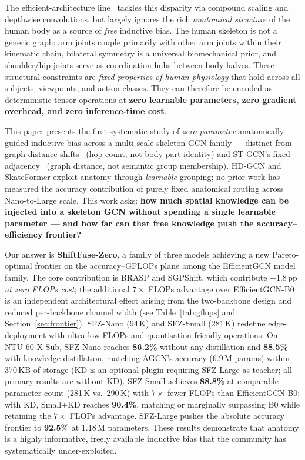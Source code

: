 \documentclass[sigconf,screen,review,anonymous]{acmart}
\begin{document}
The efficient-architecture line~\cite{efficientgcn,sgn} tackles this
disparity via compound scaling and depthwise convolutions, but largely
ignores the rich \emph{anatomical structure} of the human body as a
source of \emph{free} inductive bias.
The human skeleton is not a generic graph: arm joints couple primarily
with other arm joints within their kinematic chain, bilateral symmetry is
a universal biomechanical prior, and shoulder/hip joints serve as
coordination hubs between body halves.
These structural constraints are \emph{fixed properties of human physiology}
that hold across all subjects, viewpoints, and action classes.
They can therefore be encoded as deterministic tensor operations at
\textbf{zero learnable parameters, zero gradient overhead, and zero
inference-time cost}.

\smallskip\noindent
This paper presents the first systematic study of
\emph{zero-parameter} anatomically-guided inductive bias across a
multi-scale skeleton GCN family --- distinct from graph-distance shifts~\cite{shiftgcn}
(hop count, not body-part identity) and ST-GCN's fixed adjacency~\cite{stgcn}
(graph distance, not semantic group membership).
HD-GCN and SkateFormer exploit anatomy through \emph{learnable} grouping;
no prior work has measured the accuracy contribution of purely fixed
anatomical routing across Nano-to-Large scale.
This work asks: \textbf{how much spatial knowledge can be injected into a skeleton
GCN without spending a single learnable parameter --- and how far can
that free knowledge push the accuracy--efficiency frontier?}

Our answer is \textbf{ShiftFuse-Zero}, a family of three models achieving a
new Pareto-optimal frontier on the accuracy--GFLOPs plane among the
EfficientGCN model family.
The core contribution is BRASP and SGPShift, which contribute +1.8\,pp
\emph{at zero FLOPs cost}; the additional $7{\times}$ FLOPs advantage over
EfficientGCN-B0 is an independent architectural effect arising from the
two-backbone design and reduced per-backbone channel width (see Table~\ref{tab:gflops} and Section~\ref{sec:frontier}).
SFZ-Nano (94\,K) and SFZ-Small (281\,K) redefine edge-deployment with ultra-low
FLOPs and quantisation-friendly operations.
On NTU-60 X-Sub, SFZ-Nano reaches \textbf{86.2\%} without any distillation
and \textbf{88.5\%} with knowledge distillation, matching AGCN's accuracy
(6.9\,M params) within 370\,KB of storage (KD is an optional plugin
requiring SFZ-Large as teacher; all primary results are without KD).
SFZ-Small achieves \textbf{88.8\%} at comparable parameter count (281\,K
vs.\ 290\,K) with $7{\times}$ fewer FLOPs than EfficientGCN-B0;
with KD, Small+KD reaches \textbf{90.4\%}, matching or marginally surpassing B0
while retaining the $7{\times}$ FLOPs advantage.
SFZ-Large pushes the absolute accuracy frontier to \textbf{92.5\%} at 1.18\,M parameters.
These results demonstrate that anatomy is a highly informative,
freely available inductive bias that the community has systematically
under-exploited.
\end{document}

